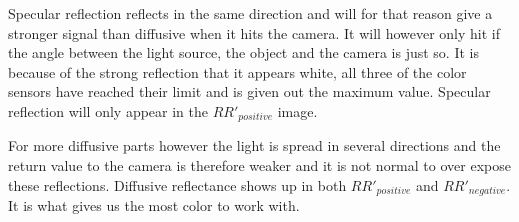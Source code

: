Specular reflection reflects in the same direction and will for that reason give a stronger signal than diffusive when it hits the camera. It will however only hit if the angle between the light source, the object and the camera is just so. It is because of the strong reflection that it appears white, all three of the color sensors have reached their limit and is given out the maximum value. Specular reflection will only appear in the $RR'_{positive}$ image. 

For more diffusive parts however the light is spread in several directions and the return value to the camera is therefore weaker and it is not normal to over expose these reflections. Diffusive reflectance shows up in both $RR'_{positive}$ and $RR'_{negative}$. It is what gives us the most color to work with. 

